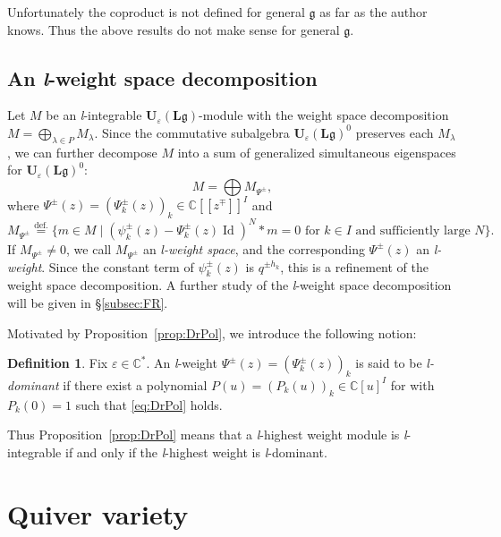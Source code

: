 \documentclass[12pt]{amsart}
\def\Bbb{\mathbb}
\theoremstyle{definition}
\newtheorem{Definition}[equation]{Definition}
\theoremstyle{remark}
\numberwithin{equation}{subsection}
\newcommand{\propref}[1]{Proposition~\ref{#1}}
\newcommand{\subsecref}[1]{\S\ref{#1}}
\newcommand{\defeq}{\overset{\operatorname{\scriptstyle def.}}{=}}
\newcommand{\C}{{\Bbb C}}
\newcommand{\Ule}{{\mathbf U}_{\varepsilon}({\mathbf L}\mathfrak g)}
\begin{document}
Unfortunately the coproduct is not defined for general $\mathfrak g$
as far as the author knows. Thus the above results do not make sense
for general $\mathfrak g$.

\subsection{An {\it l\/}-weight space decomposition}

Let $M$ be an {\it l\/}-integrable $\Ule$-module with the weight space 
decomposition $M = \bigoplus_{\lambda\in P} M_\lambda$. Since the
commutative subalgebra $\Ule^0$ preserves each $M_\lambda$, we can
further decompose $M$ into a sum of generalized simultaneous
eigenspaces for $\Ule^0$:
\begin{equation}\label{eq:gen_wt}
   M = \bigoplus M_{\Psi^\pm},
\end{equation}
where $\Psi^\pm(z) = (\Psi_k^\pm(z))_k\in \C[[z^\mp]]^I$ and
\begin{equation*}
   M_{\Psi^\pm} \defeq \{ m\in M
   \mid \text{$(\psi_k^\pm(z) - \Psi_k^\pm(z)\operatorname{Id})^N \ast m
   = 0$ for $k\in I$ and sufficiently large $N$}\}.
\end{equation*}
If $M_{\Psi^\pm}\neq 0$, we call $M_{\Psi^\pm}$ an {\it l-weight
space}, and the corresponding $\Psi^\pm(z)$ an {\it l-weight}.
%
Since the constant term of $\psi_k^\pm(z)$ is $q^{\pm h_k}$, this is a 
refinement of the weight space decomposition.
A further study of the {\it l\/}-weight space decomposition will be
given in \subsecref{subsec:FR}.

Motivated by \propref{prop:DrPol}, we introduce the following notion:
\begin{Definition}\label{def:l-dominant}
Fix $\varepsilon\in\C^*$. An {\it l\/}-weight $\Psi^\pm(z) =
(\Psi_k^\pm(z))_k$ is said to be {\it {\it l\/}-dominant\/} if there
exist a polynomial $P(u) = (P_k(u))_k\in \C[u]^I$ for with $P_k(0) =
1$ such that \eqref{eq:DrPol} holds.
\end{Definition}

Thus \propref{prop:DrPol} means that a {\it l\/}-highest weight module 
is {\it l\/}-integrable if and only if the {\it l\/}-highest weight is 
{\it l\/}-dominant.

\section{Quiver variety}\label{sec:quiver_variety}
\end{document}
